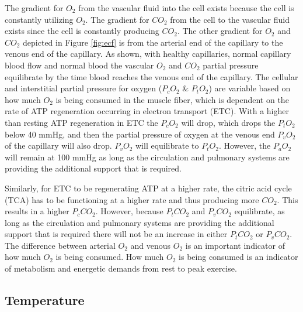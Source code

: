 The gradient for $O_2$ from the vascular fluid into the cell exists because the cell is constantly utilizing $O_2$. The gradient for $CO_2$ from the cell to the vascular fluid exists since the cell is constantly producing $CO_2$. The other gradient for $O_2$ and $CO_2$ depicted in Figure \ref{fig:ecf} is from the arterial end of the capillary to the venous end of the capillary. As shown, with healthy capillaries, normal capillary blood flow and normal blood the vascular $O_2$ and $CO_2$ partial pressure equilibrate by the time blood reaches the venous end of the capillary. The cellular and interstitial partial pressure for oxygen ($P_c O_2$ \& $P_t O_2$) are variable based on how much $O_2$ is being consumed in the muscle fiber, which is dependent on the rate of ATP regeneration occurring in electron transport (ETC). With a higher than resting ATP regeneration in ETC the $P_c O_2$ will drop, which drops the $P_t O_2$ below 40 mmHg, and then the partial pressure of oxygen at the venous end $P_v O_2$ of the capillary will also drop. $P_v O_2$ will equilibrate to $P_t O_2$. However, the $P_a O_2$ will remain at 100 mmHg as long as the circulation and pulmonary systems are providing the additional support that is required.

Similarly, for ETC to be regenerating ATP at a higher rate, the citric acid cycle (TCA) has to be functioning at a higher rate and thus producing more $CO_2$. This results in a higher $P_c CO_2$. However, because $P_t CO_2$ and $P_v CO_2$ equilibrate, as long as the circulation and pulmonary systems are providing the additional support that is required there will not be an increase in either $P_t CO_2$ or $P_v CO_2$. The difference between arterial $O_2$ and venous $O_2$ is an important indicator of how much $O_2$ is being consumed. How much $O_2$ is being consumed is an indicator of metabolism and energetic demands from rest to peak exercise. 



\subsection{Temperature}

